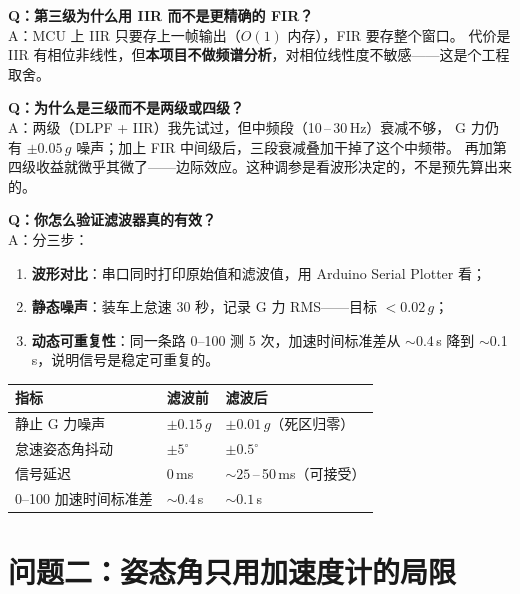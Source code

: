 \documentclass[UTF8,11pt,a4paper]{ctexart}
\begin{document}
\begin{followup}
\textbf{Q：第三级为什么用 IIR 而不是更精确的 FIR？}\\
A：MCU 上 IIR 只要存上一帧输出（$O(1)$ 内存），FIR 要存整个窗口。
代价是 IIR 有相位非线性，但\textbf{本项目不做频谱分析}，对相位线性度不敏感——这是个工程取舍。

\medskip
\textbf{Q：为什么是三级而不是两级或四级？}\\
A：两级（DLPF + IIR）我先试过，但中频段（10\,–\,30\,Hz）衰减不够，
G 力仍有 $\pm 0.05\,g$ 噪声；加上 FIR 中间级后，三段衰减叠加干掉了这个中频带。
再加第四级收益就微乎其微了——边际效应。这种调参是看波形决定的，不是预先算出来的。

\medskip
\textbf{Q：你怎么验证滤波器真的有效？}\\
A：分三步：
\begin{enumerate}[leftmargin=1.4em,topsep=2pt,itemsep=1pt]
  \item \textbf{波形对比}：串口同时打印原始值和滤波值，用 Arduino Serial Plotter 看；
  \item \textbf{静态噪声}：装车上怠速 30 秒，记录 G 力 RMS——目标 $< 0.02\,g$；
  \item \textbf{动态可重复性}：同一条路 0--100 测 5 次，加速时间标准差从 $\sim$0.4\,s 降到 $\sim$0.1\,s，说明信号是稳定可重复的。
\end{enumerate}
\end{followup}

\begin{summary}
\begin{center}\begin{tabular}{lll}
\toprule
指标 & 滤波前 & 滤波后 \\\midrule
静止 G 力噪声 & $\pm 0.15\,g$ & $\pm 0.01\,g$（死区归零）\\
怠速姿态角抖动 & $\pm 5^\circ$ & $\pm 0.5^\circ$ \\
信号延迟 & 0\,ms & $\sim 25$\,–\,50\,ms（可接受） \\
0--100 加速时间标准差 & $\sim 0.4$\,s & $\sim 0.1$\,s \\
\bottomrule
\end{tabular}\end{center}
\end{summary}

\section{问题二：姿态角只用加速度计的局限}
\end{document}
